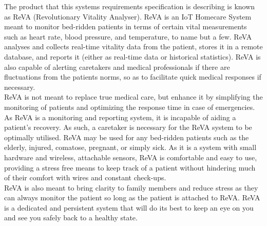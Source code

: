 The product that this systems requirements specification is describing is known as ReVA (Revolutionary Vitality Analyser).
ReVA is an IoT Homecare System meant to monitor bed-ridden patients in terms of certain vital measurements such as heart rate, blood pressure,
and temperature, to name but a few. ReVA analyses and collects real-time vitality data from the patient, stores it in a remote database, and
reports it (either as real-time data or historical statistics). ReVA is also capable of alerting caretakers and medical professionals if there 
are fluctuations from the patients norms, so as to facilitate quick medical responses if necessary.\\ReVA is not meant to replace true medical 
care, but enhance it by simplifying the monitoring of patients and optimizing the response time in case of emergencies. As ReVA is a 
monitoring and reporting system, it is incapable of aiding a patient's recovery. As such, a caretaker is necessary for the ReVA system 
to be optimally utilised. ReVA may be used for any bed-ridden patients such as the elderly, injured, comatose, pregnant, or simply sick. As it 
is a system with small hardware and wireless, attachable sensors, ReVA is comfortable and easy to use, providing a stress free means to keep track 
of a patient without hindering much of their comfort with wires and constant check-ups.\\ReVA is also meant to bring clarity to family members 
and reduce stress as they can always monitor the patient so long as the patient is attached to ReVA. ReVA is a dedicated and persistent 
system that will do its best to keep an eye on you and see you safely back to a healthy state. 
